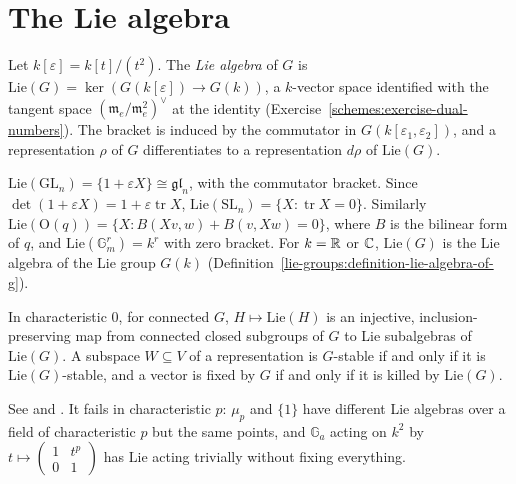 \section{The Lie algebra}\label{algebraic-groups:section-lie-algebra}

\begin{definition}\label{algebraic-groups:definition-lie-algebra}
Let $k[\varepsilon] = k[t]/(t^2)$. The \emph{Lie algebra} of $G$ is $\mathrm{Lie}(G) = \ker(G(k[\varepsilon]) \to G(k))$, a $k$-vector space identified with the tangent space
$(\mathfrak{m}_e/\mathfrak{m}_e^2)^\vee$ at the identity (Exercise~\ref{schemes:exercise-dual-numbers}). The bracket is induced by the commutator in
$G(k[\varepsilon_1, \varepsilon_2])$, and a representation $\rho$ of $G$ differentiates to a representation $d\rho$ of $\mathrm{Lie}(G)$.
\end{definition}

\begin{example}\label{algebraic-groups:example-lie-algebras}
$\mathrm{Lie}(\mathrm{GL}_n) = \{1 + \varepsilon X\} \cong \mathfrak{gl}_n$, with the commutator bracket. Since $\det(1 + \varepsilon X) = 1 + \varepsilon\operatorname{tr}X$,
$\mathrm{Lie}(\mathrm{SL}_n) = \{X : \operatorname{tr}X = 0\}$. Similarly $\mathrm{Lie}(\mathrm{O}(q)) = \{X : B(Xv, w) + B(v, Xw) = 0\}$, where $B$ is the bilinear form of $q$, and
$\mathrm{Lie}(\mathbb{G}_m^r) = k^r$ with zero bracket. For $k = \mathbb{R}$ or $\mathbb{C}$, $\mathrm{Lie}(G)$ is the Lie algebra of the Lie group $G(k)$
(Definition~\ref{lie-groups:definition-lie-algebra-of-g}).
\end{example}

\begin{proposition}\label{algebraic-groups:proposition-lie-correspondence}
In characteristic $0$, for connected $G$, $H \mapsto \mathrm{Lie}(H)$ is an injective, inclusion-preserving map from connected closed subgroups of $G$ to Lie subalgebras of
$\mathrm{Lie}(G)$. A subspace $W \subseteq V$ of a representation is $G$-stable if and only if it is $\mathrm{Lie}(G)$-stable, and a vector is fixed by $G$ if and only if it is
killed by $\mathrm{Lie}(G)$.
\end{proposition}

See \cite{borel-lag} and \cite{milne-algebraic-groups}. It fails in characteristic $p$: $\mu_p$ and $\{1\}$ have
different Lie algebras over a field of characteristic $p$ but the same points, and $\mathbb{G}_a$ acting on $k^2$ by $t \mapsto \left(\begin{smallmatrix}1 & t^p \\ 0 & 1\end{smallmatrix}\right)$
has $\mathrm{Lie}$ acting trivially without fixing everything.

